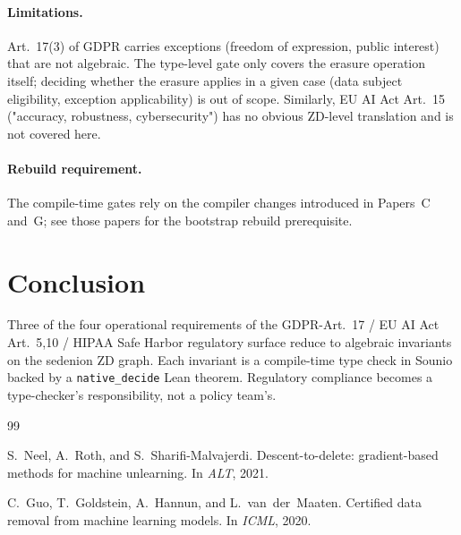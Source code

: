 \documentclass{article}
\begin{document}
\paragraph{Limitations.}
Art.~17(3) of GDPR carries exceptions (freedom of expression, public
interest) that are not algebraic.  The type-level gate only covers the
erasure operation itself; deciding whether the erasure applies in a
given case (data subject eligibility, exception applicability) is out
of scope.  Similarly, EU AI Act Art.~15 ("accuracy, robustness,
cybersecurity") has no obvious ZD-level translation and is not
covered here.

\paragraph{Rebuild requirement.}
The compile-time gates rely on the compiler changes introduced in
Papers~C and~G; see those papers for the bootstrap rebuild prerequisite.

\section{Conclusion}

Three of the four operational requirements of the GDPR-Art.~17 /
EU AI Act Art.~5,10 / HIPAA Safe Harbor regulatory surface reduce to
algebraic invariants on the sedenion ZD graph.  Each invariant is a
compile-time type check in Sounio backed by a \texttt{native\_decide}
Lean theorem.  Regulatory compliance becomes a type-checker's
responsibility, not a policy team's.

\begin{thebibliography}{99}

S.~Neel, A.~Roth, and S.~Sharifi-Malvajerdi.
\newblock Descent-to-delete: gradient-based methods for machine unlearning.
\newblock In \emph{ALT}, 2021.

C.~Guo, T.~Goldstein, A.~Hannun, and L.~van~der~Maaten.
\newblock Certified data removal from machine learning models.
\newblock In \emph{ICML}, 2020.

\end{thebibliography}
\end{document}
